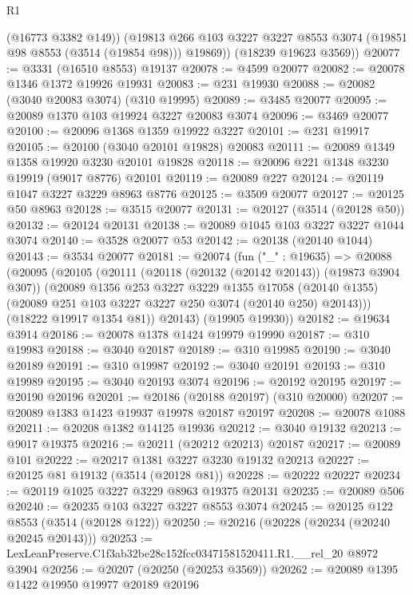 \begin{lexlean}{R1}
\begin{coremodule}
          (@16773 @3382 @149))
        (@19813 @266 @103 @3227 @3227 @8553 @3074 (@19851 @98 @8553 (@3514 (@19854 @98))) @19869))
      (@18239 @19623 @3569))
@20077 := @3331 (@16510 @8553) @19137
@20078 := @4599 @20077
@20082 := @20078 @1346 @1372 @19926 @19931
@20083 := @231 @19930
@20088 := @20082 (@3040 @20083 @3074) (@310 @19995)
@20089 := @3485 @20077
@20095 := @20089 @1370 @103 @19924 @3227 @20083 @3074
@20096 := @3469 @20077
@20100 := @20096 @1368 @1359 @19922 @3227
@20101 := @231 @19917
@20105 := @20100 (@3040 @20101 @19828) @20083
@20111 := @20089 @1349 @1358 @19920 @3230 @20101 @19828
@20118 := @20096 @221 @1348 @3230 @19919 (@9017 @8776) @20101
@20119 := @20089 @227
@20124 := @20119 @1047 @3227 @3229 @8963 @8776
@20125 := @3509 @20077
@20127 := @20125 @50 @8963
@20128 := @3515 @20077
@20131 := @20127 (@3514 (@20128 @50))
@20132 := @20124 @20131
@20138 := @20089 @1045 @103 @3227 @3227 @1044 @3074
@20140 := @3528 @20077 @53
@20142 := @20138 (@20140 @1044)
@20143 := @3534 @20077
@20181 := @20074
    (fun ("_" : @19635) =>
    @20088
      (@20095
        (@20105
          (@20111
            (@20118 (@20132 (@20142 @20143)) (@19873 @3904 @307))
            (@20089
              @1356
              @253
              @3227
              @3229
              @1355
              @17058
              (@20140 @1355)
              (@20089 @251 @103 @3227 @3227 @250 @3074 (@20140 @250) @20143)))
          (@18222 @19917 @1354 @81))
        @20143)
      (@19905 @19930))
@20182 := @19634 @3914
@20186 := @20078 @1378 @1424 @19979 @19990
@20187 := @310 @19983
@20188 := @3040 @20187
@20189 := @310 @19985
@20190 := @3040 @20189
@20191 := @310 @19987
@20192 := @3040 @20191
@20193 := @310 @19989
@20195 := @3040 @20193 @3074
@20196 := @20192 @20195
@20197 := @20190 @20196
@20201 := @20186 (@20188 @20197) (@310 @20000)
@20207 := @20089 @1383 @1423 @19937 @19978 @20187 @20197
@20208 := @20078 @1088
@20211 := @20208 @1382 @14125 @19936
@20212 := @3040 @19132
@20213 := @9017 @19375
@20216 := @20211 (@20212 @20213) @20187
@20217 := @20089 @101
@20222 := @20217 @1381 @3227 @3230 @19132 @20213
@20227 := @20125 @81 @19132 (@3514 (@20128 @81))
@20228 := @20222 @20227
@20234 := @20119 @1025 @3227 @3229 @8963 @19375 @20131
@20235 := @20089 @506
@20240 := @20235 @103 @3227 @3227 @8553 @3074
@20245 := @20125 @122 @8553 (@3514 (@20128 @122))
@20250 := @20216 (@20228 (@20234 (@20240 @20245 @20143)))
@20253 := LexLeanPreserve.C1f3ab32be28c152fcc03471581520411.R1.__rel_20 @8972 @3904
@20256 := @20207 (@20250 (@20253 @3569))
@20262 := @20089 @1395 @1422 @19950 @19977 @20189 @20196

\end{coremodule}
\end{lexlean}
